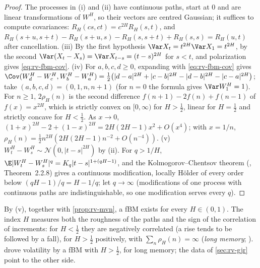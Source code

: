 \begin{proof}
The processes in (i) and (ii) have continuous paths, start at $0$ and are linear transformations of
$W^H$, so their vectors are centred Gaussian; it suffices to compute covariances:
$R_H(cs,ct)=c^{2H}R_H(s,t)$, and $R_H(s+u,s+t)-R_H(s+u,s)-R_H(s,s+t)+R_H(s,s)=R_H(u,t)$ after cancellation.
(iii) By the first hypothesis $\Var X_t=t^{2H}\Var X_1=t^{2H}$, by the second
$\Var(X_t-X_s)=\Var X_{t-s}=(t-s)^{2H}$ for $s<t$, and polarization gives \eqref{eq:rv-fbm-cov}.
(iv) For $a,b,c,d\ge0$, expanding with \eqref{eq:rv-fbm-cov} gives
$\Cov(W^H_d-W^H_c,W^H_b-W^H_a)=\frac12\big(|d-a|^{2H}+|c-b|^{2H}-|d-b|^{2H}-|c-a|^{2H}\big)$; take
$(a,b,c,d)=(0,1,n,n+1)$ (for $n=0$ the formula gives $\Var W^H_1=1$). For $n\ge1$, $2\rho_H(n)$ is the
second difference $f(n+1)-2f(n)+f(n-1)$ of $f(x)=x^{2H}$, which is strictly convex on $[0,\infty)$ for
$H>\frac12$, linear for $H=\frac12$ and strictly concave for $H<\frac12$. As $x\to0$,
$(1+x)^{2H}-2+(1-x)^{2H}=2H(2H-1)x^2+O(x^4)$; with $x=1/n$, $\rho_H(n)=\frac12n^{2H}(2H(2H-1)n^{-2}+O(n^{-4}))$.
(v) $W^H_t-W^H_s\sim\mathcal N(0,|t-s|^{2H})$ by (ii). For $q>1/H$, $\E|W^H_t-W^H_s|^q=K_q|t-s|^{1+(qH-1)}$,
and the Kolmogorov--Chentsov theorem (\textcite{karatzas-shreve}, Theorem~2.2.8) gives a continuous
modification, locally H\"older of every order below $(qH-1)/q=H-1/q$; let $q\to\infty$ (modifications of
one process with continuous paths are indistinguishable, so one modification serves every $q$).
\end{proof}

By (v), together with \cref{prop:rv-mvn}, a fBM exists for every $H\in(0,1)$. The index $H$ measures
both the roughness of the paths and the sign of the correlation of increments: for $H<\frac12$ they are
negatively correlated (a rise tends to be followed by a fall), for $H>\frac12$ positively, with
$\sum_n\rho_H(n)=\infty$ (\emph{long memory}; ). \textcite{comte-renault-1998} drove
volatility by a fBM with $H>\frac12$, for long memory; the data of \cref{sec:rv-gjr} point to the other
side.

